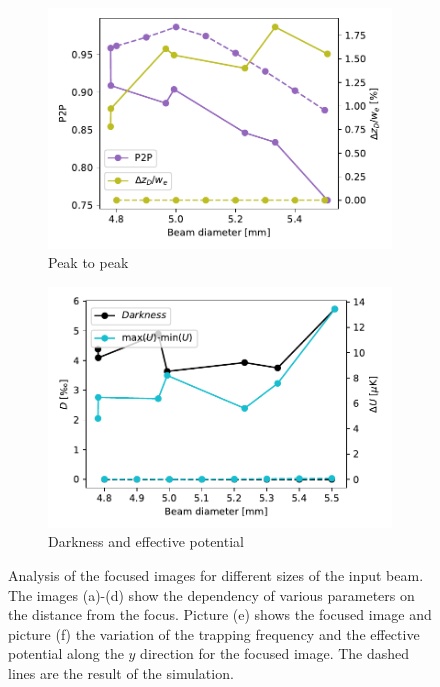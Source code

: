 \begin{figure}
    \begin{subfigure}{0.5\textwidth}
        \includegraphics[width=\textwidth]{chapters/chapter_3/figures/p2p_focus+sim.pdf}
        \caption{Peak to peak}
    \end{subfigure}
    \begin{subfigure}{0.5\textwidth}
        \includegraphics[width=\textwidth]{chapters/chapter_3/figures/darkenss_focus+sim.pdf}
        \caption{Darkness and effective potential}
        \label{fig:diam_dark}
    \end{subfigure}
    \caption{Analysis of the focused images for different sizes of the input beam. The images (a)-(d) show the dependency of various parameters on the distance from the focus. Picture (e) shows the focused image and picture (f) the variation of the trapping frequency and the effective potential along the $y$ direction for the focused image. The dashed lines are the result of the simulation.}
    \label{fig:analysis_diam}
\end{figure}

